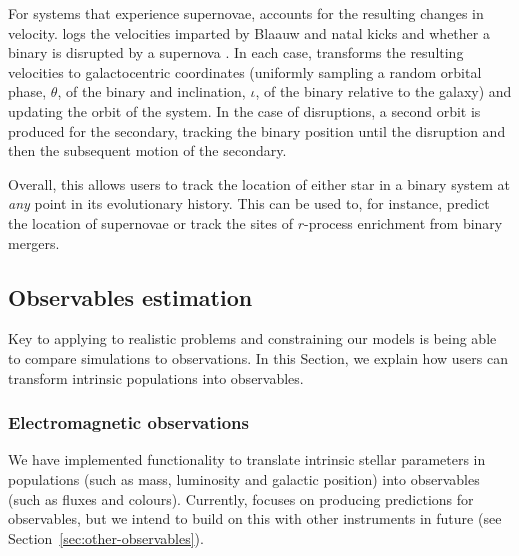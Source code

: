 \documentclass[twocolumn, twocolappendix, oneside, linenumbers]{aastex631}
\begin{document}
For systems that experience supernovae, \cogsworth accounts for the resulting changes in velocity. \cosmic logs the velocities imparted by Blaauw \citep{Blaauw+1961} and natal kicks \citep{Katz+1975:1975Natur.253..698K,Janka+2012:2012ARNPS..62..407J,Janka+2017:2017ApJ...837...84J} and whether a binary is disrupted by a supernova \citep[e.g.,][]{Renzo+2019:2019A&A...624A..66R}. In each case, \cogsworth transforms the resulting velocities to galactocentric coordinates (uniformly sampling a random orbital phase, $\theta$, of the binary and inclination, $\iota$, of the binary relative to the galaxy) and updating the orbit of the system. In the case of disruptions, a second orbit is produced for the secondary, tracking the binary position until the disruption and then the subsequent motion of the secondary.

Overall, this allows users to track the location of either star in a binary system at \textit{any} point in its evolutionary history. This can be used to, for instance, predict the location of supernovae or track the sites of $r$-process enrichment from binary mergers.
\newpage
\subsection{Observables estimation}\label{sec:observables}

Key to applying \cogsworth{} to realistic problems and constraining our models is being able to compare simulations to observations. In this Section, we explain how users can transform intrinsic \cogsworth populations into observables.

\subsubsection{Electromagnetic observations}

We have implemented functionality to translate intrinsic stellar parameters in \cogsworth populations (such as mass, luminosity and galactic position) into observables (such as fluxes and colours). Currently, \cogsworth focuses on producing predictions for \gaia observables, but we intend to build on this with other instruments in future (see Section~\ref{sec:other-observables}). 
\end{document}
